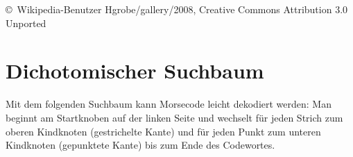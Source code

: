 \documentclass{scrartcl}
\begin{document}
    \vfill
    
    \hfill
    \begin{minipage}{8cm}
      \scriptsize\color{gray}
      \copyright\ Wikipedia-Benutzer Hgrobe/gallery/2008,
        Creative Commons Attribution 3.0 Unported
    \end{minipage}
    \hfill\strut
    
    \newpage
    
    \section{Dichotomischer Suchbaum}
    
    Mit dem folgenden Suchbaum kann Morsecode leicht dekodiert werden:
    Man beginnt am Startknoben auf der linken Seite
    und wechselt für jeden Strich
    zum oberen Kindknoten (gestrichelte Kante)
    und für jeden Punkt zum unteren Kindknoten (gepunktete Kante) bis zum
    Ende des Codewortes. 
    
\end{document}
